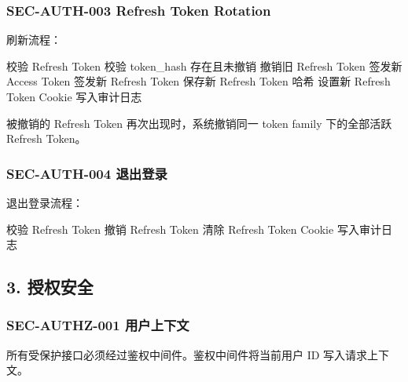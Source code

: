\documentclass[
  a4paper,
  UTF8]{ctexart}
\newenvironment{Shaded}{}{}
\newcommand{\NormalTok}[1]{#1}
\begin{document}
\hypertarget{sec-auth-003-refresh-token-rotation}{%
\subsubsection{SEC-AUTH-003 Refresh Token
Rotation}\label{sec-auth-003-refresh-token-rotation}}

刷新流程：

\begin{Shaded}
\begin{Highlighting}[]
\NormalTok{校验 Refresh Token}
\NormalTok{校验 token\_hash 存在且未撤销}
\NormalTok{撤销旧 Refresh Token}
\NormalTok{签发新 Access Token}
\NormalTok{签发新 Refresh Token}
\NormalTok{保存新 Refresh Token 哈希}
\NormalTok{设置新 Refresh Token Cookie}
\NormalTok{写入审计日志}
\end{Highlighting}
\end{Shaded}

被撤销的 Refresh Token 再次出现时，系统撤销同一 token family
下的全部活跃 Refresh Token。

\hypertarget{sec-auth-004-ux9000ux51faux767bux5f55}{%
\subsubsection{SEC-AUTH-004
退出登录}\label{sec-auth-004-ux9000ux51faux767bux5f55}}

退出登录流程：

\begin{Shaded}
\begin{Highlighting}[]
\NormalTok{校验 Refresh Token}
\NormalTok{撤销 Refresh Token}
\NormalTok{清除 Refresh Token Cookie}
\NormalTok{写入审计日志}
\end{Highlighting}
\end{Shaded}

\hypertarget{ux6388ux6743ux5b89ux5168}{%
\subsection{3. 授权安全}\label{ux6388ux6743ux5b89ux5168}}

\hypertarget{sec-authz-001-ux7528ux6237ux4e0aux4e0bux6587}{%
\subsubsection{SEC-AUTHZ-001
用户上下文}\label{sec-authz-001-ux7528ux6237ux4e0aux4e0bux6587}}

所有受保护接口必须经过鉴权中间件。鉴权中间件将当前用户 ID
写入请求上下文。
\end{document}
